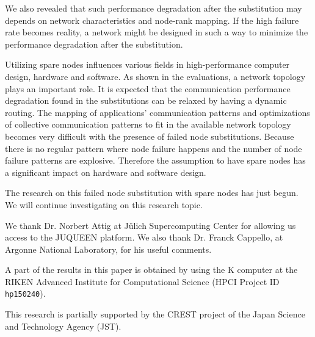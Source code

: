 \documentclass[Afour,times,sagev]{sagej}
\begin{document}
We also revealed that such performance degradation after the
substitution may depends on network characteristics and node-rank
mapping. If the high failure rate becomes reality, a network might be
designed in such a way to minimize the performance degradation after
the substitution.

Utilizing spare nodes influences various fields in high-performance
computer design, hardware and software. As shown in the evaluations,
a network topology plays an important role. It is expected that the
communication performance degradation found in the substitutions can
be relaxed by having a dynamic routing. The mapping of applications'
communication patterns and optimizations of collective
communication patterns to fit in the available network topology becomes
very difficult with the presence of failed node substitutions. Because
there is no regular pattern where node failure happens and the
number of node failure patterns are explosive. Therefore the
assumption to have spare nodes has a significant impact on hardware
and software design.

The research on this failed node substitution with spare nodes has
just begun. We will continue investigating on this research topic.

\begin{acks}
We thank Dr. Norbert Attig at J\"{u}lich Supercomputing Center for
allowing us access to the JUQUEEN platform. We also thank Dr. Franck
Cappello, at Argonne National Laboratory, for his useful
comments.

A part of the results in this paper is obtained by using the K
computer at the RIKEN Advanced Institute for Computational
Science (HPCI Project ID {\tt hp150240}).
\end{acks}

\begin{funding}
This research is partially supported by the CREST project of
the Japan Science and Technology Agency (JST).
\end{funding}



\end{document}
